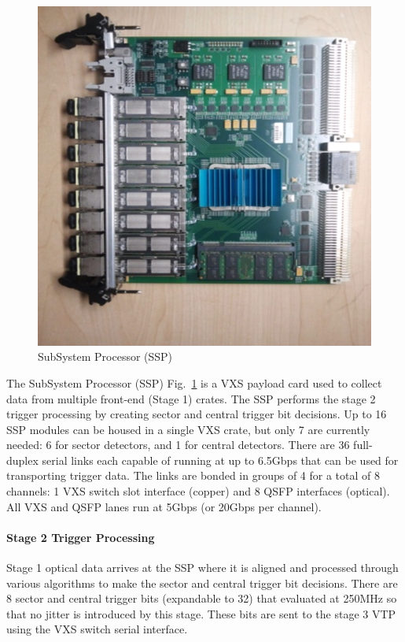 \begin{figure}[hbt]
	\centering
	\includegraphics[width=1.0\columnwidth,keepaspectratio]{img/ssp_board.png}
	\caption{SubSystem Processor (SSP)}
	\label{fig:ssp_board}
\end{figure}

The SubSystem Processor (SSP) Fig.~\ref{fig:ssp_board} is a VXS payload card used to collect data from multiple front-end (Stage 1) crates. The SSP performs the stage 2 trigger processing by creating sector and central trigger bit decisions. Up to 16 SSP modules can be housed in a single VXS crate, but only 7 are currently needed: 6 for sector detectors, and 1 for central detectors. There are 36 full-duplex serial links each capable of running at up to 6.5Gbps that can be used for transporting trigger data. The links are bonded in groups of 4 for a total of 8 channels: 1 VXS switch slot interface (copper) and 8 QSFP interfaces (optical). All VXS and QSFP lanes run at 5Gbps (or 20Gbps per channel).

\paragraph{Stage 2 Trigger Processing}
Stage 1 optical data arrives at the SSP where it is aligned and processed through various algorithms to make the sector and central trigger bit decisions. There are 8 sector and central trigger bits (expandable to 32) that evaluated at 250MHz so that no jitter is introduced by this stage. These bits are sent to the stage 3 VTP using the VXS switch serial interface.



